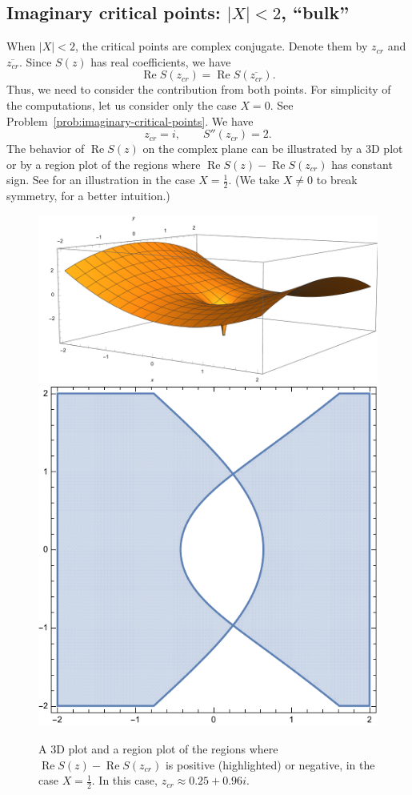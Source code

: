 \documentclass[letterpaper,11pt,oneside,reqno]{article}
\numberwithin{equation}{section}
\theoremstyle{definition}
\begin{document}
\subsection{Imaginary critical points: $|X|<2$, ``bulk''}
\label{sub:imaginary-critical-points}

When $|X|<2$, the critical points are complex conjugate.
Denote them by $z_{cr}$ and $\overline{z_{cr}}$.
Since $S(z)$ has real coefficients, we have
\begin{equation*}
	\operatorname{Re}S(z_{cr})=\operatorname{Re}S(\overline{z_{cr}}).
\end{equation*}
Thus, we need to consider the contribution from both points.
For simplicity of the computations, let us consider only the case $X=0$.
See Problem~\ref{prob:imaginary-critical-points}.
We have
\begin{equation*}
	z_{cr}=i,\qquad
	S''(z_{cr})=2.
\end{equation*}
The behavior of $\operatorname{Re}S(z)$ on the complex plane
can be illustrated by a 3D plot or by a region plot of the regions
where $\operatorname{Re}S(z)-\operatorname{Re}S(z_{cr})$ has constant sign.
See  for an illustration in the case $X=\frac{1}{2}$.
(We take $X\ne 0$ to break symmetry, for a better intuition.)

\begin{figure}[htpb]
	\centering
	\includegraphics[height=.3\textwidth]{pictures/ReS_imaginary_3D.pdf}
	\qquad
	\includegraphics[height=.3\textwidth]{pictures/ReS_imaginary_region.pdf}
	\caption{A 3D plot and a region plot of the
	regions where $\operatorname{Re}S(z)-\operatorname{Re}S(z_{cr})$ is positive
	(highlighted) or negative, in the case $X=\frac{1}{2}$.
	In this case, $z_{cr}\approx 0.25+0.96 i$.}
	\label{fig:ReS_imaginary}
\end{figure}
\end{document}
